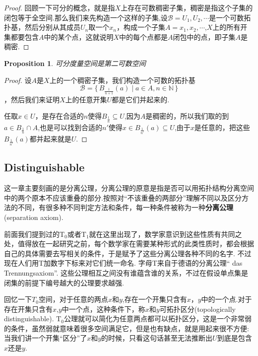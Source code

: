 \documentclass{article}
\newtheorem{proposition}[theorem]{Proposition}
\newcommand\Set[2]{\{\,#1\mid#2\,\}} %
\begin{document}
\begin{proof}
回顾一下可分的概念，就是指$X$上存在可数稠密子集，稠密是指这个子集的闭包等于全空间.那么我们来先构造一个这样的子集,设$\mathscr{B}={U_1,U_2,\cdots}$是一个可数拓扑基，然后分别从其成员$U_n$取一个$x_n$，构成一个子集$A={x_1,x_2,\cdots}$,$X$上的所有开集都要包含$A$中的某个点，这就说明$X$中的每个点都是$A$闭包中的点，即子集$A$是稠密.
\end{proof}

\begin{proposition}
可分度量空间是第二可数空间
\end{proposition}

\begin{proof}
设$A$是$X$上的一个稠密子集，我们构造一个可数的拓扑基\[\mathscr{B}=\Set{B_{\frac{1}{n+1}}(a)}{a \in A,n \in \mathbb{N}}\]，然后我们来证明$X$上的任意开集$U$都是它们并起来的.

任取$x \in U$，是存在合适的$n$使得$B_{\frac{1}{n}} \subseteq U$,因为$A$是稠密的，所以我们取的到$a \in B_{\frac{1}{n}} \cap A$,也是可以找到合适的$n'$使得$x \in B_{\frac{1}{n'}}(a) \subseteq U$,由于$x$是任意的，把这些$B_{\frac{1}{n'}}(a)$都并起来就是$U$.
\end{proof}


\newpage

\subsection{Distinguishable}

这一章主要刻画的是分离公理，分离公理的原意是指是否可以用拓扑结构分离空间中的两个原本不应该重叠的部分.按照对“不该重叠的两部分”理解不同以及区分方法的不同，有很多种不同判定方法和条件，每一种条件被称为一种\textbf{分离公理}(separation axiom).

前面我们提到过的$\text{T}_0$或者$\text{T}_1$就在这里出现了，数学家意识到这些性质有共同之处，值得放在一起研究之前，每个数学家在需要某种形式的此类性质时，都会根据自己的具体需要去写相关的条件，于是赋予了这些分离公理各种不同的名字. 不过现在人们用T加数字下标来对它们统一命名. 字母T来自于德语的分离公理“	das Trennungsaxiom”. 这些公理相互之间没有谁蕴含谁的关系，不过在假设单点集是闭集的前提下编号越大的公理要求越强. 

回忆一下$T_0$空间，对于任意的两点$x$和$y$,存在一个开集只含有$x$，$y$中的一个点.对于存在开集只含有$x$,$y$中一个点，这种条件下，称$x$和$y$可拓扑区分(topologically distinguishable). $\text{T}_0$公理就可以简化为任意两点都可以拓扑区分，这是一个非常弱的条件，虽然弱就意味着很多空间满足它，但是也有缺点，就是用起来很不方便: 当我们讲一个开集“区分”了$x$和$y$的时候，只看这句话甚至无法推断出$U$到底是包含$x$还是$y$.
\end{document}
